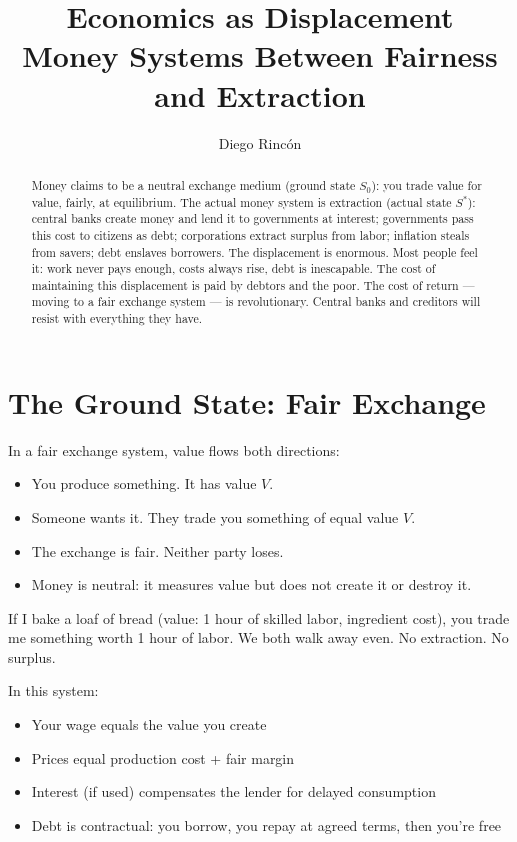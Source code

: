 \documentclass[12pt]{article}
\title{Economics as Displacement\\
Money Systems Between Fairness and Extraction}
\author{Diego Rincón}
\date{}
\begin{document}
\maketitle

\begin{abstract}
Money claims to be a neutral exchange medium (ground state $S_0$): you trade value for value, fairly, at equilibrium. The actual money system is extraction (actual state $S^*$): central banks create money and lend it to governments at interest; governments pass this cost to citizens as debt; corporations extract surplus from labor; inflation steals from savers; debt enslaves borrowers. The displacement is enormous. Most people feel it: work never pays enough, costs always rise, debt is inescapable. The cost of maintaining this displacement is paid by debtors and the poor. The cost of return — moving to a fair exchange system — is revolutionary. Central banks and creditors will resist with everything they have.
\end{abstract}

\section{The Ground State: Fair Exchange}

In a fair exchange system, value flows both directions:
\begin{itemize}
\item You produce something. It has value $V$.
\item Someone wants it. They trade you something of equal value $V$.
\item The exchange is fair. Neither party loses.
\item Money is neutral: it measures value but does not create it or destroy it.
\end{itemize}

If I bake a loaf of bread (value: 1 hour of skilled labor, ingredient cost), you trade me something worth 1 hour of labor. We both walk away even. No extraction. No surplus.

In this system:
\begin{itemize}
\item Your wage equals the value you create
\item Prices equal production cost + fair margin
\item Interest (if used) compensates the lender for delayed consumption
\item Debt is contractual: you borrow, you repay at agreed terms, then you're free
\end{itemize}
\end{document}
